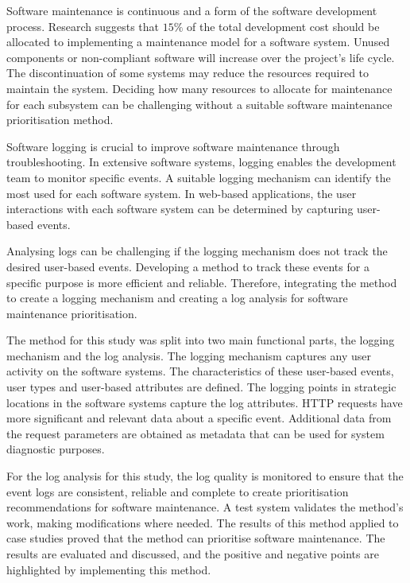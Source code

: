 Software maintenance is continuous and a form of the software development process. Research suggests that $15\%$ of the total development cost should be allocated to implementing a maintenance model for a software system. Unused components or non-compliant software will increase over the project's life cycle. The discontinuation of some systems may reduce the resources required to maintain the system. Deciding how many resources to allocate for maintenance for each subsystem can be challenging without a suitable software maintenance prioritisation method. \par Software logging is crucial to improve software maintenance through troubleshooting. In extensive software systems, logging enables the development team to monitor specific events. A suitable logging mechanism can identify the most used for each software system. In web-based applications, the user interactions with each software system can be determined by capturing user-based events. \par Analysing logs can be challenging if the logging mechanism does not track the desired user-based events. Developing a method to track these events for a specific purpose is more efficient and reliable. Therefore, integrating the method to create a logging mechanism and creating a log analysis for software maintenance prioritisation. \par The method for this study was split into two main functional parts, the logging mechanism and the log analysis. The logging mechanism captures any user activity on the software systems. The characteristics of these user-based events, user types and user-based attributes are defined. The logging points in strategic locations in the software systems capture the log attributes. HTTP requests have more significant and relevant data about a specific event. Additional data from the request parameters are obtained as metadata that can be used for system diagnostic purposes.\par For the log analysis for this study, the log quality is monitored to ensure that the event logs are consistent, reliable and complete to create prioritisation recommendations for software maintenance. A test system validates the method's work, making modifications where needed. The results of this method applied to case studies proved that the method can prioritise software maintenance. The results are evaluated and discussed, and the positive and negative points are highlighted by implementing this method.
